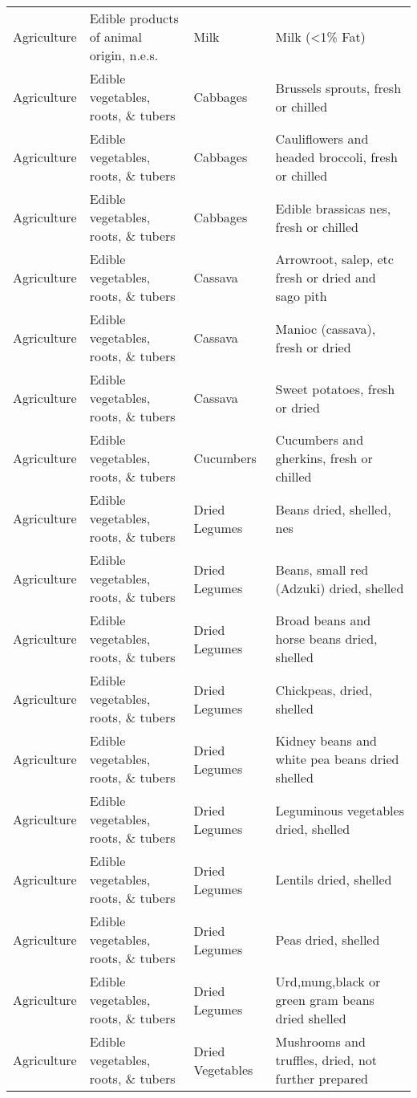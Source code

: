 \begin{appendices}
\begin{xltabular}{\textwidth}{|p{0.07\textwidth}|p{0.28\textwidth}|p{0.24\textwidth}|p{0.31\textwidth}|}
	Agriculture & Edible products of animal origin, n.e.s. & Milk & Milk (<1\% Fat) \\
	Agriculture & Edible vegetables, roots, \& tubers & Cabbages & Brussels sprouts, fresh or chilled \\
	Agriculture & Edible vegetables, roots, \& tubers & Cabbages & Cauliflowers and headed broccoli, fresh or chilled \\
	Agriculture & Edible vegetables, roots, \& tubers & Cabbages & Edible brassicas nes, fresh or chilled \\
	Agriculture & Edible vegetables, roots, \& tubers & Cassava & Arrowroot, salep, etc fresh or dried and sago pith \\
	Agriculture & Edible vegetables, roots, \& tubers & Cassava & Manioc (cassava), fresh or dried \\
	Agriculture & Edible vegetables, roots, \& tubers & Cassava & Sweet potatoes, fresh or dried \\
	Agriculture & Edible vegetables, roots, \& tubers & Cucumbers & Cucumbers and gherkins, fresh or chilled \\
	Agriculture & Edible vegetables, roots, \& tubers & Dried Legumes & Beans dried, shelled, nes \\
	Agriculture & Edible vegetables, roots, \& tubers & Dried Legumes & Beans, small red (Adzuki) dried, shelled \\
	Agriculture & Edible vegetables, roots, \& tubers & Dried Legumes & Broad beans and horse beans dried, shelled \\
	Agriculture & Edible vegetables, roots, \& tubers & Dried Legumes & Chickpeas, dried, shelled \\
	Agriculture & Edible vegetables, roots, \& tubers & Dried Legumes & Kidney beans and white pea beans dried shelled \\
	Agriculture & Edible vegetables, roots, \& tubers & Dried Legumes & Leguminous vegetables dried, shelled \\
	Agriculture & Edible vegetables, roots, \& tubers & Dried Legumes & Lentils dried, shelled \\
	Agriculture & Edible vegetables, roots, \& tubers & Dried Legumes & Peas dried, shelled \\
	Agriculture & Edible vegetables, roots, \& tubers & Dried Legumes & Urd,mung,black or green gram beans dried shelled \\
	Agriculture & Edible vegetables, roots, \& tubers & Dried Vegetables & Mushrooms and truffles, dried, not further prepared \\

\end{xltabular}
\end{appendices}
